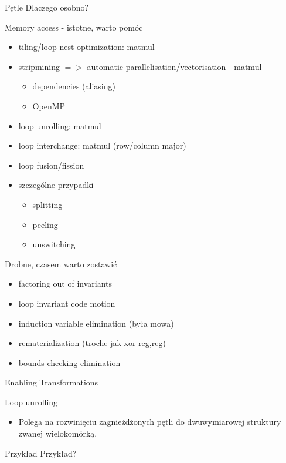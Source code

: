 \begin{frame}{Pętle}
	Dlaczego osobno?
	\begin{block}{Memory access - istotne, warto pomóc}
		\begin{itemize}
			\item tiling/loop nest optimization: matmul
			\item stripmining $=>$ automatic parallelisation/vectorisation - matmul
				\begin{itemize}
					\item dependencies (aliasing)
					\item OpenMP
				\end{itemize}
			\item loop unrolling: matmul
			\item loop interchange: matmul (row/column major)
			\item loop fusion/fission
			\item szczególne przypadki
				\begin{itemize}
					\item splitting
					\item peeling
					\item unswitching
				\end{itemize}
		\end{itemize}
	\end{block}
	\begin{block}{Drobne, czasem warto zostawić}
		\begin{itemize}
			\item factoring out of invariants
			\item loop invariant code motion
			\item induction variable elimination (była mowa)
			\item rematerialization (troche jak xor reg,reg)
			\item bounds checking elimination
		\end{itemize}
	\end{block}
\end{frame}
\begin{frame}[fragile]{Enabling Transformations}
	\begin{block}{Loop unrolling}
		\begin{itemize}
		 \item Polega na rozwinięciu zagnieżdżonych pętli do dwuwymiarowej struktury zwanej
		 wielokomórką.
		\end{itemize}
	\end{block}
	\begin{block}{Przykład}
		Przykład?
	\end{block}
\end{frame}
